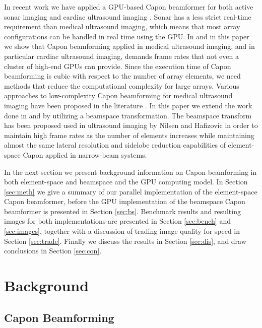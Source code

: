\documentclass[journal]{IEEEtran}
\begin{document}
In recent work we have applied a GPU-based Capon beamformer for both active sonar imaging \cite{Buskenes, Buskenes2013} and cardiac ultrasound imaging \cite{asen2012}. Sonar has a less strict real-time requirement than medical ultrasound imaging, which means that most array configurations can be handled in real time using the GPU. In \cite{asen2012} and in this paper we show that Capon beamforming applied in medical ultrasound imaging, and in particular cardiac ultrasound imaging, demands frame rates that not even a cluster of high-end GPUs can provide. Since the execution time of Capon beamforming is cubic with respect to the number of array elements, we need methods that reduce the computational complexity for large arrays. Various approaches to low-complexity Capon beamforming for medical ultrasound imaging have been proposed in the literature \cite{Synnevag2011, Asl2012, Jensen2012, Kim}. In this paper we extend the work done in \cite{asen2012} and \cite{Buskenes2013} by utilizing a beamspace transformation. The beamspace transform has been proposed used in ultrasound imaging by Nilsen and Hafizovic \cite{Nilsen2009} in order to maintain high frame rates as the number of elements increases while maintaining almost the same lateral resolution and sidelobe reduction capabilities of element-space Capon applied in narrow-beam systems.

In the next section we present background information on Capon beamforming in both element-space and beamspace and the GPU computing model. In Section \ref{sec:meth} we give a summary of our parallel implementation of the element-space Capon beamformer, before the GPU implementation of the beamspace Capon beamformer is presented in Section \ref{sec:bs}. Benchmark results and resulting images for both implementations are presented in Section \ref{sec:bench} and \ref{sec:images}, together with a discussion of trading image quality for speed in Section \ref{sec:trade}. Finally we discuss the results in Section \ref{sec:dis}, and draw conclusions in Section \ref{sec:con}. 

\section{Background}\label{background}

\subsection{Capon Beamforming}\label{sec:es-capon}
\end{document}
